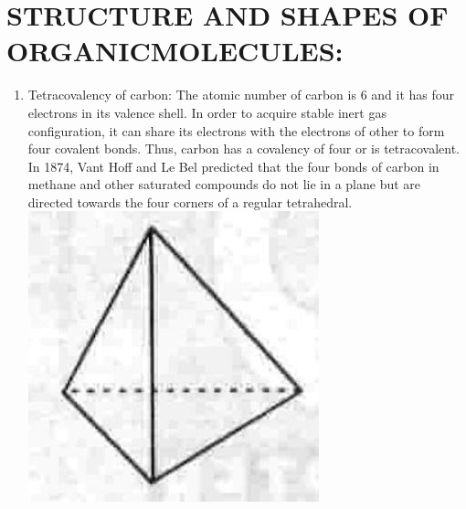 \documentclass[10pt]{article}
\begin{document}
\section*{STRUCTURE AND SHAPES OF ORGANICMOLECULES:}
\begin{enumerate}
  \item Tetracovalency of carbon: The atomic number of carbon is 6 and it has four electrons in its valence shell. In order to acquire stable inert gas configuration, it can share its electrons with the electrons of other to form four covalent bonds. Thus, carbon has a covalency of four or is tetracovalent. In 1874, Vant Hoff and Le Bel predicted that the four bonds of carbon in methane and other saturated compounds do not lie in a plane but are directed towards the four corners of a regular tetrahedral.\\
\includegraphics[max width=\textwidth, center]{2025_01_28_8470952b98110cec3aabg-004(1)}
\end{enumerate}
\end{document}
